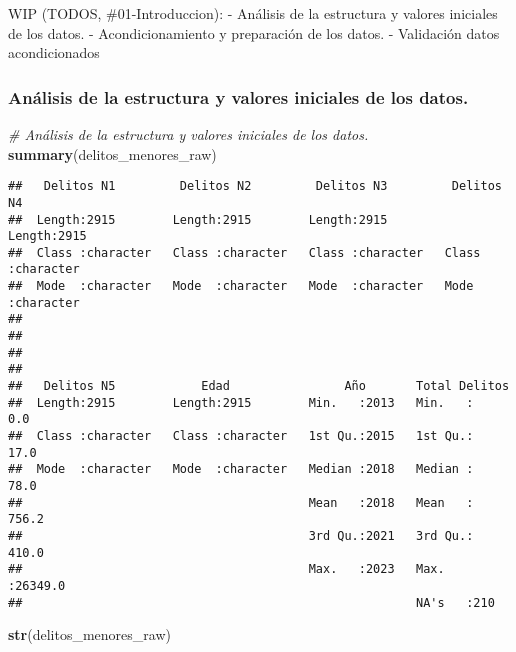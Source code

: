 \documentclass[,,,,pdftex]{Definitions/mdpi}
\newenvironment{Shaded}{\begin{snugshade}}{\end{snugshade}}
\newcommand{\CommentTok}[1]{\textcolor[rgb]{0.56,0.35,0.01}{\textit{#1}}}
\newcommand{\FunctionTok}[1]{\textcolor[rgb]{0.13,0.29,0.53}{\textbf{#1}}}
\newcommand{\NormalTok}[1]{#1}
\begin{document}
WIP (TODOS, \#01-Introduccion): - Análisis de la estructura y valores
iniciales de los datos. - Acondicionamiento y preparación de los datos.
- Validación datos acondicionados

\subsubsection{Análisis de la estructura y valores iniciales de los
datos.}\label{anuxe1lisis-de-la-estructura-y-valores-iniciales-de-los-datos.}

\begin{Shaded}
\begin{Highlighting}[]
\CommentTok{\# Análisis de la estructura y valores iniciales de los datos.}
\FunctionTok{summary}\NormalTok{(delitos\_menores\_raw)}
\end{Highlighting}
\end{Shaded}

\begin{verbatim}
##   Delitos N1         Delitos N2         Delitos N3         Delitos N4       
##  Length:2915        Length:2915        Length:2915        Length:2915       
##  Class :character   Class :character   Class :character   Class :character  
##  Mode  :character   Mode  :character   Mode  :character   Mode  :character  
##                                                                             
##                                                                             
##                                                                             
##                                                                             
##   Delitos N5            Edad                Año       Total Delitos    
##  Length:2915        Length:2915        Min.   :2013   Min.   :    0.0  
##  Class :character   Class :character   1st Qu.:2015   1st Qu.:   17.0  
##  Mode  :character   Mode  :character   Median :2018   Median :   78.0  
##                                        Mean   :2018   Mean   :  756.2  
##                                        3rd Qu.:2021   3rd Qu.:  410.0  
##                                        Max.   :2023   Max.   :26349.0  
##                                                       NA's   :210
\end{verbatim}

\begin{Shaded}
\begin{Highlighting}[]
\FunctionTok{str}\NormalTok{(delitos\_menores\_raw)}
\end{Highlighting}
\end{Shaded}
\end{document}
